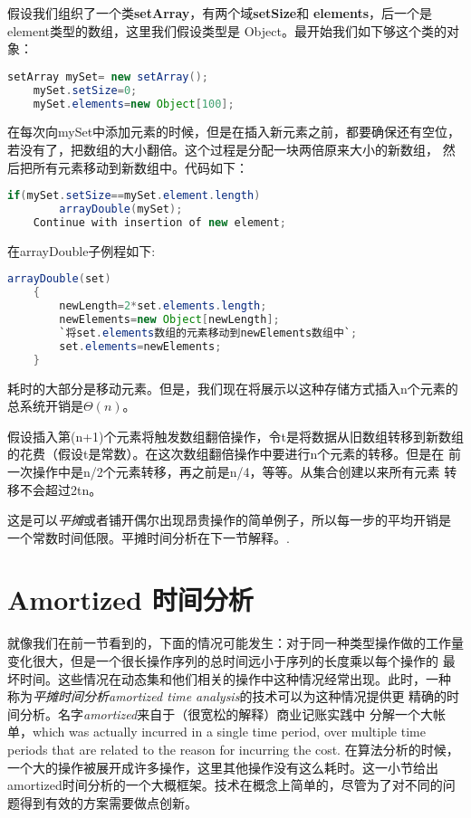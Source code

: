假设我们组织了一个类\textbf{setArray}，有两个域\textbf{setSize}和
\textbf{elements}，后一个是element类型的数组，这里我们假设类型是
Object。最开始我们如下够这个类的对象：
\begin{lstlisting}[language={Java},keywordstyle=\color{blue!70}, commentstyle=\color{red!50!green!50!blue!50}]
    setArray mySet= new setArray();
    mySet.setSize=0;
    mySet.elements=new Object[100];
\end{lstlisting}
在每次向mySet中添加元素的时候，但是在插入新元素之前，都要确保还有空位，
若没有了，把数组的大小翻倍。这个过程是分配一块两倍原来大小的新数组，
然后把所有元素移动到新数组中。代码如下：
\begin{lstlisting}[language={Java},keywordstyle=\color{blue!70}, commentstyle=\color{red!50!green!50!blue!50}]
    if(mySet.setSize==mySet.element.length)
        arrayDouble(mySet);
    Continue with insertion of new element;
\end{lstlisting}
在arrayDouble子例程如下:
\begin{lstlisting}[language={Java},keywordstyle=\color{blue!70}, commentstyle=\color{red!50!green!50!blue!50}]
    arrayDouble(set)
    {
        newLength=2*set.elements.length;
        newElements=new Object[newLength];
        `将set.elements数组的元素移动到newElements数组中`;
        set.elements=newElements;
    }
\end{lstlisting}

耗时的大部分是移动元素。但是，我们现在将展示以这种存储方式插入n个元素的
总系统开销是$\Theta(n)$。

假设插入第(n+1)个元素将触发数组翻倍操作，令t是将数据从旧数组转移到新数组
的花费（假设t是常数）。在这次数组翻倍操作中要进行n个元素的转移。但是在
前一次操作中是n/2个元素转移，再之前是n/4，等等。从集合创建以来所有元素
转移不会超过2tn。

这是可以\emph{平摊}或者铺开偶尔出现昂贵操作的简单例子，所以每一步的平均开销是
一个常数时间低限。平摊时间分析在下一节解释。.

\section{Amortized 时间分析}
就像我们在前一节看到的，下面的情况可能发生：对于同一种类型操作做的工作量
变化很大，但是一个很长操作序列的总时间远小于序列的长度乘以每个操作的
最坏时间。这些情况在动态集和他们相关的操作中这种情况经常出现。此时，一种
称为\emph{平摊时间分析amortized time analysis}的技术可以为这种情况提供更
精确的时间分析。名字\emph{amortized}来自于（很宽松的解释）商业记账实践中
分解一个大帐单，which was actually incurred in a single time period, over multiple time periods that are related to the reason for incurring the cost. 在算法分析的时候，一个大的操作被展开成许多操作，这里其他操作没有这么耗时。这一小节给出amortized时间分析的一个大概框架。技术在概念上简单的，尽管为了对不同的问题得到有效的方案需要做点创新。

